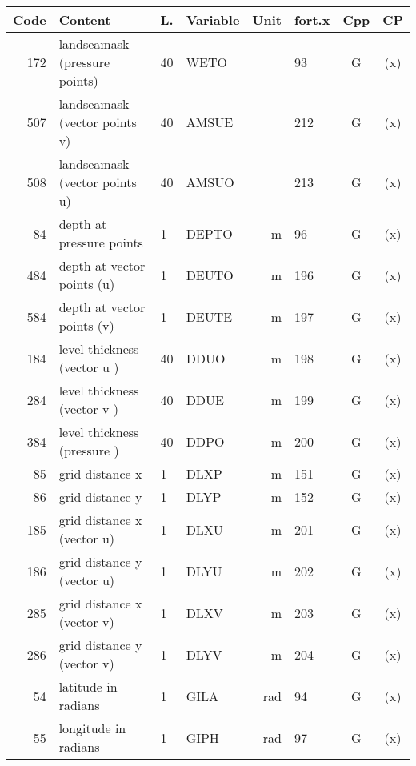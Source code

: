\begin{table}
\begin{footnotesize}
\begin{tabular}{r|l|l|l|r|l|c|c}
Code & Content  		       & L.    &  Variable	&   Unit    &	fort.x &  Cpp  &    CP    \\ \hline
172  & landseamask (pressure points)   & 40    &  WETO  	&	    &	93     &  G    &    (x)   \\
507  & landseamask (vector points v)   & 40    &  AMSUE 	&	    &  212     &  G    &    (x)   \\
508  & landseamask (vector points u)   & 40    &  AMSUO 	&	    &  213     &  G    &    (x)   \\
 84  & depth at pressure points        &  1    &  DEPTO 	&   m	    &	96     &  G    &    (x)   \\
484  & depth at vector points (u)      &  1    &  DEUTO 	&   m	    &  196     &  G    &    (x)   \\
584  & depth at vector points (v)      &  1    &  DEUTE 	&   m	    &  197     &  G    &    (x)   \\
184  & level thickness (vector u )     & 40    &  DDUO  	&   m	    &  198     &  G    &    (x)   \\
284  & level thickness (vector v )     & 40    &  DDUE  	&   m	    &  199     &  G    &    (x)   \\
384  & level thickness (pressure )     & 40    &  DDPO  	&   m	    &  200     &  G    &    (x)   \\
 85  & grid distance x  	       &  1    &  DLXP  	&   m	    &  151     &  G    &    (x)   \\
 86  & grid distance y  	       &  1    &  DLYP  	&   m	    &  152     &  G    &    (x)   \\
185  & grid distance x  (vector u)     &  1    &  DLXU  	&   m	    &  201     &  G    &    (x)   \\ 
186  & grid distance y  (vector u)     &  1    &  DLYU  	&   m	    &  202     &  G    &    (x)   \\
285  & grid distance x  (vector v)     &  1    &  DLXV  	&   m	    &  203     &  G    &    (x)   \\
286  & grid distance y  (vector v)     &  1    &  DLYV  	&   m	    &  204     &  G    &    (x)   \\
 54  & latitude in radians	       &  1    &  GILA  	&   rad     &	94     &  G    &    (x)   \\
 55  & longitude in radians	       &  1    &  GIPH  	&   rad     &	97     &  G    &    (x)   \\

\end{tabular}
\end{footnotesize}
\end{table}
